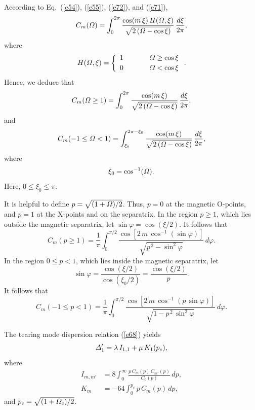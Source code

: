 \documentclass[12pt,prb,aps]{revtex4-1}
\begin{document}
According to Eq.~(\ref{e54}), (\ref{e55}), (\ref{e72}), and (\ref{e71}), 
\begin{equation}
 C_m({\mit\Omega})= \int_{0}^{2\pi}\frac{\cos(m\,\xi)\,H({\mit\Omega},\xi)}
 {\sqrt{2\left({\mit\Omega}-\cos\xi\right)}}\,\frac{d\xi}{2\pi},
 \end{equation}
 where
 \begin{equation}
 H({\mit\Omega},\xi) = \left\{
 \begin{array}{ccc} 1&~~~~~&{\mit\Omega}\geq \cos\xi\\[0.5ex]
 0 &&{\mit\Omega}< \cos\xi\end{array}\right..
 \end{equation}
 Hence, we deduce that
 \begin{equation}
 C_m({\mit\Omega}\geq 1)= \int_{0}^{2\pi}\frac{\cos(m\,\xi)}
 {\sqrt{2\left({\mit\Omega}-\cos\xi\right)}}\,\frac{d\xi}{2\pi},
\end{equation}
and 
 \begin{equation}
C_m(-1\leq {\mit\Omega}<1)= \int_{\xi_0}^{2\pi-\xi_0}\frac{\cos(m\,\xi)}
 {\sqrt{2\left({\mit\Omega}-\cos\xi\right)}}\,\frac{d\xi}{2\pi}, 
\end{equation}
 where
\begin{equation}
\xi_0=\cos^{-1}({\mit\Omega}).
\end{equation}
Here, $0\leq \xi_0\leq \pi$. 

It is helpful to define $p = \sqrt{(1+{\mit\Omega})/2}$. Thus, $p=0$ at the magnetic O-points, and $p=1$ at the
X-points and on the separatrix. In the region $p\geq1$, which lies outside the magnetic separatrix, let $\sin\varphi = \cos(\xi/2)$. 
It follows that 
\begin{equation}
 C_m(p\geq 1)=\frac{1}{\pi} \int_{0}^{\pi/2}\frac{\cos[2\,m\,\cos^{-1}(\sin\varphi)]}
 {\sqrt{p^{\,2}-\sin^2\varphi}}\,d\varphi.
\end{equation}
In the region $0\leq p< 1$, which lies inside the magnetic separatrix, let 
\begin{equation}
\sin\varphi = \frac{\cos(\xi/2)}{\cos(\xi_0/2)}=\frac{\cos(\xi/2)}{p}.
\end{equation}
 It follows that 
\begin{equation}
 C_m(-1\leq p< 1)=\frac{1}{\pi} \int_{0}^{\pi/2}\frac{\cos[2\,m\,\cos^{-1}(p\,\sin\varphi)]}
 {\sqrt{1-p^{\,2}\,\sin^2\varphi}}\,d\varphi.
\end{equation}

The tearing mode dispersion relation (\ref{e68}) yields
\begin{equation}\label{e82}
{\mit\Delta}_1' = \lambda\,I_{1,1}+\mu\,K_1(p_c),
\end{equation}
where
\begin{align}
I_{m,m'} &= 8\int_0^\infty\frac{p\,C_m(p)\,C_{m'}(p)}{C_0(p)}\,dp,\\[0.5ex]
K_m &= -64 \int_0^{p_c} p\,C_m(p)\,dp,
\end{align}
and $p_c= \sqrt{(1+{\mit\Omega}_c)/2}$. 
\end{document}
